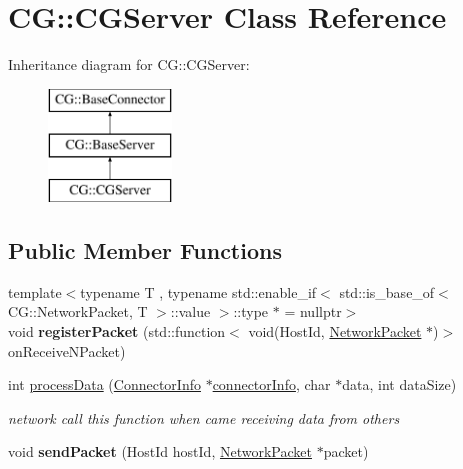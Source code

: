 \hypertarget{class_c_g_1_1_c_g_server}{}\section{CG\+:\+:C\+G\+Server Class Reference}
\label{class_c_g_1_1_c_g_server}
Inheritance diagram for CG\+:\+:C\+G\+Server\+:\begin{figure}[H]
\begin{center}
\leavevmode
\includegraphics[height=3.000000cm]{class_c_g_1_1_c_g_server}
\end{center}
\end{figure}
\subsection*{Public Member Functions}
\begin{DoxyCompactItemize}
\item 
\mbox{\label{class_c_g_1_1_c_g_server_a6ab75a0350236cb0c279dc2a052e13fb}} 
{\footnotesize template$<$typename T , typename std\+::enable\+\_\+if$<$ std\+::is\+\_\+base\+\_\+of$<$ C\+G\+::\+Network\+Packet, T $>$\+::value $>$\+::type $\ast$  = nullptr$>$ }\\void {\bfseries register\+Packet} (std\+::function$<$ void(Host\+Id, \mbox{\hyperlink{class_c_g_1_1_network_packet}{Network\+Packet}} $\ast$)$>$ on\+Receive\+N\+Packet)
\item 
int \mbox{\hyperlink{class_c_g_1_1_c_g_server_a12598a365b61be0b9d7169a7d1aded49}{process\+Data}} (\mbox{\hyperlink{class_c_g_1_1_connector_info}{Connector\+Info}} $\ast$\mbox{\hyperlink{class_c_g_1_1_base_connector_ae68321ba56404549f2e655238035ed8d}{connector\+Info}}, char $\ast$data, int data\+Size)
\begin{DoxyCompactList}\small\item\em network call this function when came receiving data from others \end{DoxyCompactList}\item 
\mbox{\label{class_c_g_1_1_c_g_server_ab7d95f379dde4cbc48acc476e1475d6a}} 
void {\bfseries send\+Packet} (Host\+Id host\+Id, \mbox{\hyperlink{class_c_g_1_1_network_packet}{Network\+Packet}} $\ast$packet)
\end{DoxyCompactItemize}
